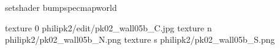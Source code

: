 setshader bumpspecmapworld

texture 0 philipk2/edit/pk02_wall05b_C.jpg
texture n philipk2/pk02_wall05b_N.png
texture s philipk2/pk02_wall05b_S.png

